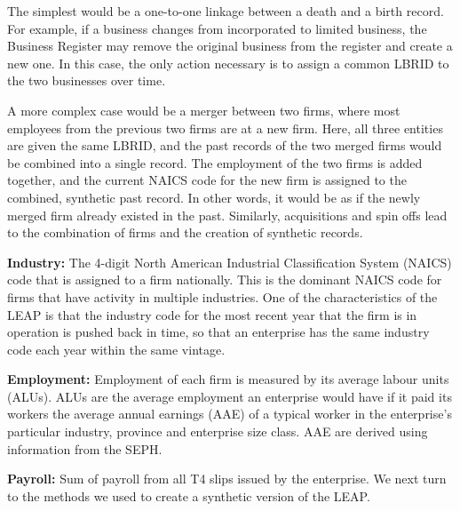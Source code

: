The simplest would be a one-to-one linkage between a death and a birth record. For example, if a business changes from incorporated to limited business, the Business Register may remove the original business from the register and create a new one. In this case, the only action necessary is to assign a common LBRID to the two businesses over time. 

A more complex case would be a merger between two firms, where most employees from the previous two firms are at a new firm. Here, all three entities are given the same LBRID, and the past records of the two merged firms would be combined into a single record. The employment of the two firms is added together, and the current NAICS code for the new firm is assigned to the combined, synthetic past record. In other words, it would be as if the newly merged firm already existed in the past. Similarly, acquisitions and spin offs lead to the combination of firms and the creation of synthetic records. 

\textbf{Industry:} The 4-digit North American Industrial Classification System (NAICS) code that is assigned to a firm nationally. This is the dominant NAICS code for firms that have activity in multiple industries. One of the characteristics of the LEAP is that the industry code for the most recent year that the firm is in operation is pushed back in time, so that an enterprise has the same industry code each year within the same vintage.  

\textbf{Employment:} Employment of each firm is measured by its average labour units (ALUs). ALUs are the average employment an enterprise would have if it paid its workers the average annual earnings (AAE) of a typical worker in the enterprise's particular industry, province and enterprise size class. AAE are derived using information from the SEPH.

\textbf{Payroll:} Sum of payroll from all T4 slips issued by the enterprise.
We next turn to the methods we used to create a synthetic version of the LEAP.

